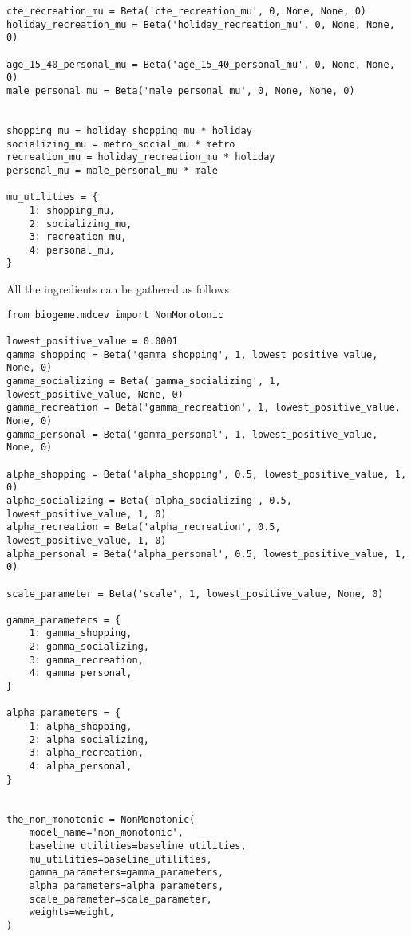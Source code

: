 \documentclass[12pt,a4paper]{article}
\begin{document}
\begin{description}
\begin{center}
\begin{lstlisting}
cte_recreation_mu = Beta('cte_recreation_mu', 0, None, None, 0)
holiday_recreation_mu = Beta('holiday_recreation_mu', 0, None, None, 0)

age_15_40_personal_mu = Beta('age_15_40_personal_mu', 0, None, None, 0)
male_personal_mu = Beta('male_personal_mu', 0, None, None, 0)


shopping_mu = holiday_shopping_mu * holiday
socializing_mu = metro_social_mu * metro
recreation_mu = holiday_recreation_mu * holiday
personal_mu = male_personal_mu * male

mu_utilities = {
    1: shopping_mu,
    2: socializing_mu,
    3: recreation_mu,
    4: personal_mu,
}
        \end{lstlisting}
      \end{center}

 All the ingredients can be gathered as follows.
    \begin{center}
         \begin{lstlisting}
from biogeme.mdcev import NonMonotonic

lowest_positive_value = 0.0001
gamma_shopping = Beta('gamma_shopping', 1, lowest_positive_value, None, 0)
gamma_socializing = Beta('gamma_socializing', 1, lowest_positive_value, None, 0)
gamma_recreation = Beta('gamma_recreation', 1, lowest_positive_value, None, 0)
gamma_personal = Beta('gamma_personal', 1, lowest_positive_value, None, 0)

alpha_shopping = Beta('alpha_shopping', 0.5, lowest_positive_value, 1, 0)
alpha_socializing = Beta('alpha_socializing', 0.5, lowest_positive_value, 1, 0)
alpha_recreation = Beta('alpha_recreation', 0.5, lowest_positive_value, 1, 0)
alpha_personal = Beta('alpha_personal', 0.5, lowest_positive_value, 1, 0)

scale_parameter = Beta('scale', 1, lowest_positive_value, None, 0)

gamma_parameters = {
    1: gamma_shopping,
    2: gamma_socializing,
    3: gamma_recreation,
    4: gamma_personal,
}

alpha_parameters = {
    1: alpha_shopping,
    2: alpha_socializing,
    3: alpha_recreation,
    4: alpha_personal,
}


the_non_monotonic = NonMonotonic(
    model_name='non_monotonic',
    baseline_utilities=baseline_utilities,
    mu_utilities=baseline_utilities,
    gamma_parameters=gamma_parameters,
    alpha_parameters=alpha_parameters,
    scale_parameter=scale_parameter,
    weights=weight,
)
         \end{lstlisting}
     \end{center}
\end{description}
\end{document}
